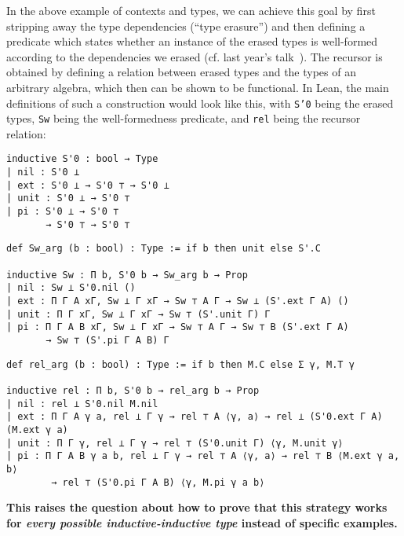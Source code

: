 \documentclass{easychair}
\begin{document}
In the above example of contexts and types, we can achieve this goal by
first stripping away the type dependencies (``type erasure'') and then defining
a predicate which states whether an instance of the erased types is well-formed
according to the dependencies we erased (cf. last year's talk~\cite{types2018}).
The recursor is obtained by defining a relation between erased types and the
types of an arbitrary algebra, which then can be shown to be functional.
In Lean, the main definitions of such a construction would look like this, with
\texttt{S'0} being the erased types, \texttt{Sw} being the well-formedness predicate,
and \texttt{rel} being the recursor relation:
\noindent
\begin{minipage}{.33\textwidth}
\begin{lstlisting}
inductive S'0 : bool → Type
| nil : S'0 ⊥
| ext : S'0 ⊥ → S'0 ⊤ → S'0 ⊥
| unit : S'0 ⊥ → S'0 ⊤
| pi : S'0 ⊥ → S'0 ⊤
       → S'0 ⊤ → S'0 ⊤
\end{lstlisting}
\end{minipage} \hfill
\begin{minipage}{.65\textwidth}
\begin{lstlisting}
def Sw_arg (b : bool) : Type := if b then unit else S'.C

inductive Sw : Π b, S'0 b → Sw_arg b → Prop
| nil : Sw ⊥ S'0.nil ()
| ext : Π Γ A xΓ, Sw ⊥ Γ xΓ → Sw ⊤ A Γ → Sw ⊥ (S'.ext Γ A) ()
| unit : Π Γ xΓ, Sw ⊥ Γ xΓ → Sw ⊤ (S'.unit Γ) Γ
| pi : Π Γ A B xΓ, Sw ⊥ Γ xΓ → Sw ⊤ A Γ → Sw ⊤ B (S'.ext Γ A)
       → Sw ⊤ (S'.pi Γ A B) Γ
\end{lstlisting}
\end{minipage}
\noindent\begin{minipage}{\textwidth}\begin{lstlisting}
def rel_arg (b : bool) : Type := if b then M.C else Σ γ, M.T γ

inductive rel : Π b, S'0 b → rel_arg b → Prop
| nil : rel ⊥ S'0.nil M.nil
| ext : Π Γ A γ a, rel ⊥ Γ γ → rel ⊤ A ⟨γ, a⟩ → rel ⊥ (S'0.ext Γ A) (M.ext γ a)
| unit : Π Γ γ, rel ⊥ Γ γ → rel ⊤ (S'0.unit Γ) ⟨γ, M.unit γ⟩
| pi : Π Γ A B γ a b, rel ⊥ Γ γ → rel ⊤ A ⟨γ, a⟩ → rel ⊤ B ⟨M.ext γ a, b⟩
        → rel ⊤ (S'0.pi Γ A B) ⟨γ, M.pi γ a b⟩
\end{lstlisting}
\end{minipage}

\noindent \textbf{This raises the question about how to prove that this strategy works for \emph{every
possible inductive-inductive type} instead of specific examples.}
\end{document}
